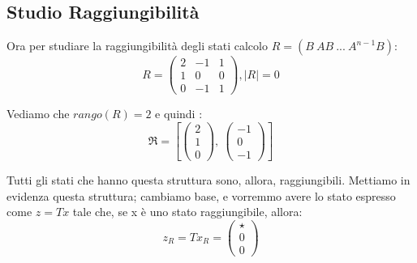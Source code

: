 \documentclass{article}
\begin{document}
\subsection{Studio Raggiungibilità}
Ora per studiare la raggiungibilità degli stati calcolo $R = (B\ AB\ ...\ A^{n-1}B)$: \[ R = \left(\begin{matrix}2 & -1 & 1\\1 & 0 & 0\\0 & -1 & 1\end{matrix}\right), |R| = 0 \] 

Vediamo che $rango(R) = 2$ e quindi : \[ \mathfrak{R} = \left[ \left(\begin{matrix}2\\1\\0\end{matrix}\right), \  \left(\begin{matrix}-1\\0\\-1\end{matrix}\right)\right] \]

Tutti gli stati che hanno questa struttura sono, allora, raggiungibili. Mettiamo in evidenza questa struttura;
cambiamo base, e vorremmo avere lo stato espresso come $z = Tx$ tale che, se x è uno stato raggiungibile, allora: \[ z_R = T x_R = \begin{pmatrix} \star  \\ 0 \\0\end{pmatrix}\]
\end{document}
